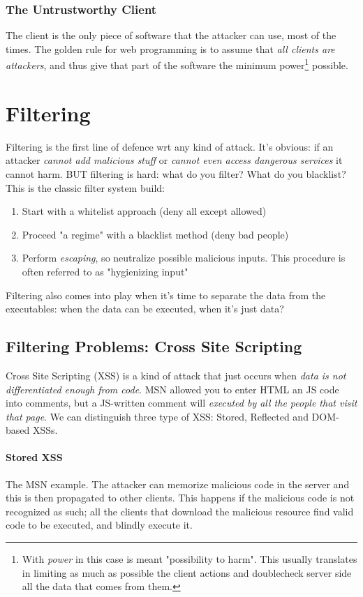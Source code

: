 \documentclass{article}
\begin{document}
				\subsubsection{The Untrustworthy Client}
					The client is the only piece of software that the attacker can use, most of the times. The golden rule for web programming is to assume that \emph{all clients are attackers}, and thus give that part of the software the minimum power\footnote{With \emph{power} in this case is meant "possibility to harm". This usually translates in limiting as much as possible the client actions and doublecheck server side all the data that comes from them.} possible.
				
		\section{Filtering}
			Filtering is the first line of defence wrt any kind of attack. It's obvious: if an attacker \emph{cannot add malicious stuff} or \emph{cannot even access dangerous services} it cannot harm. BUT filtering is hard: what do you filter? What do you blacklist? This is the classic filter system build:
			\begin{enumerate}
				\item Start with a whitelist approach (deny all except allowed)
				\item Proceed "a regime" with a blacklist method (deny bad people)
				\item Perform \emph{escaping}, so neutralize possible malicious inputs. This procedure is often referred to as "hygienizing input"
			\end{enumerate}
			Filtering also comes into play when it's time to separate the data from the executables: when the data can be executed, when it's just data?
			
			\subsection{Filtering Problems: Cross Site Scripting}
				Cross Site Scripting (XSS) is a kind of attack that just occurs when \emph{data is not differentiated enough from code}. MSN allowed you to enter HTML an JS code into comments, but a JS-written comment will \emph{executed by all the people that visit that page}. We can distinguish three type of XSS: Stored, Reflected and DOM-based XSSs.
				
				\paragraph{Stored XSS}
					The MSN example. The attacker can memorize malicious code in the server and this is then propagated to other clients. This happens if the malicious code is not recognized as such; all the clients that download the malicious resource find valid code to be executed, and blindly execute it.
					
\end{document}
